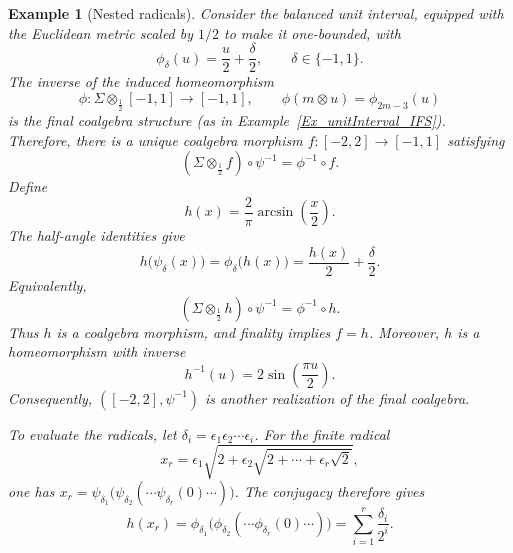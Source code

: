 \documentclass{sn-jnl}%
\theoremstyle{thmstyleone}%
\theoremstyle{thmstyletwo}%
\newtheorem{example}{Example}%
\theoremstyle{thmstylethree}%
\newcommand{\M}{\Sigma}
\newcommand{\Fww}[1]{\M\otimes_{#1}}
\begin{document}
\begin{example}[Nested radicals]
    Consider the balanced unit interval, equipped with the Euclidean metric scaled by $1/2$ to make it one-bounded, with 
    \begin{equation} 
    \nonumber
       \phi_\delta(u)=\frac{u}{2}+\frac{\delta}{2}, \qquad \delta\in\{-1,1\}.
    \end{equation}
    The inverse of the induced homeomorphism
    \begin{equation} 
    \nonumber
       \phi:\Fww{\frac12}[-1,1]\longrightarrow[-1,1],\qquad \phi(m\otimes u)=\phi_{2m-3}(u)
    \end{equation}
    is the final coalgebra structure (as in Example~\ref{Ex_unitInterval_IFS}). Therefore, there is a unique coalgebra morphism $ f:[-2,2]\longrightarrow[-1,1]$ satisfying
    \begin{equation} 
    \nonumber
       (\Fww{\frac12}f)\circ\psi^{-1} = \phi^{-1}\circ f.
    \end{equation}
    Define
    \begin{equation} 
    \nonumber
       h(x)=\frac{2}{\pi}\arcsin\left(\frac{x}{2}\right).
    \end{equation}
    The half-angle identities give
    \begin{equation} 
    \nonumber
       h\bigl(\psi_\delta(x)\bigr) = \phi_\delta\bigl(h(x)\bigr) = \frac{h(x)}{2}+\frac{\delta}{2}.
    \end{equation}
    Equivalently,
    \begin{equation} 
    \nonumber
       (\Fww{\frac12}h)\circ\psi^{-1} = \phi^{-1}\circ h.
    \end{equation}
    Thus $h$ is a coalgebra morphism, and finality implies $f=h$. Moreover, $h$ is a homeomorphism with inverse
    \begin{equation} 
    \nonumber
       h^{-1}(u)=2\sin\left(\frac{\pi u}{2}\right).
    \end{equation}
    Consequently, $([-2,2],\psi^{-1})$ is another realization of the final coalgebra.
    
    To evaluate the radicals, let $\delta_i=\epsilon_1\epsilon_2\cdots\epsilon_i$. For the finite radical 
    \begin{equation} 
    \nonumber
       x_r = \epsilon_1\sqrt{ 2+\epsilon_2\sqrt{ 2+\cdots+\epsilon_r\sqrt2 }},
    \end{equation}
    one has $x_r = \psi_{\delta_1} \bigl( \psi_{\delta_2} (\cdots\psi_{\delta_r}(0)\cdots) \bigr)$. The conjugacy therefore gives
    \begin{equation} 
    \nonumber
       h(x_r) = \phi_{\delta_1} \bigl( \phi_{\delta_2} (\cdots\phi_{\delta_r}(0)\cdots)        \bigr) = \sum_{i=1}^{r}\frac{\delta_i}{2^i}.
    \end{equation}
    

\end{example}
\end{document}

